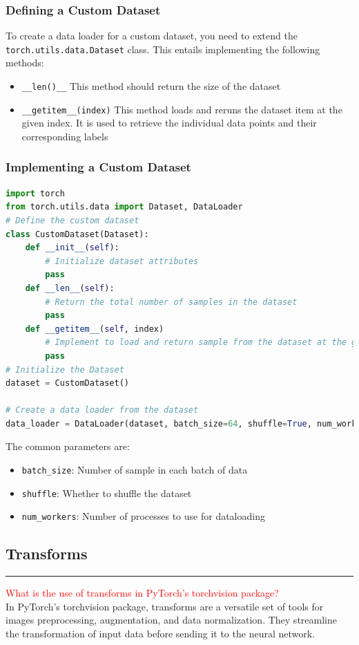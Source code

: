 \documentclass{article}
\newcommand{\code}[1]{\colorbox{light-gray}{\texttt{#1}}}
\begin{document}
\subsubsection{Defining a Custom Dataset}
To create a data loader for a custom dataset, you need to extend the \code{torch.utils.data.Dataset} class. This entails implementing the following methods:
\begin{itemize}
    \item \code{\_\_len()\_\_} This method should return the size of the dataset
    \item \code{\_\_getitem\_\_(index)} This method loads and reruns the dataset item at the given index. It is used to retrieve the individual data points and their corresponding labels
\end{itemize}
\subsubsection{Implementing a Custom Dataset}
\begin{lstlisting}[language=Python]
import torch
from torch.utils.data import Dataset, DataLoader
# Define the custom dataset
class CustomDataset(Dataset):
    def __init__(self):
        # Initialize dataset attributes
        pass
    def __len__(self):
        # Return the total number of samples in the dataset
        pass
    def __getitem__(self, index)
        # Implement to load and return sample from the dataset at the given index
        pass
# Initialize the Dataset
dataset = CustomDataset()

# Create a data loader from the dataset
data_loader = DataLoader(dataset, batch_size=64, shuffle=True, num_workers=2)
\end{lstlisting}
The common parameters are:
\begin{itemize}
    \item \code{batch\_size}: Number of sample in each batch of data
    \item \code{shuffle}: Whether to shuffle the dataset
    \item \code{num\_workers}: Number of processes to use for dataloading
\end{itemize}
\subsection{Transforms}
\noindent
{\color{red} \rule{\linewidth}{0.5mm}}
\textcolor{red}{What is the use of transforms in PyTorch's torchvision package?} \\
\noindent
In PyTorch's torchvision package, transforms are a versatile set of tools for images preprocessing, augmentation, and data normalization. They streamline the transformation of input data before sending it to the neural network. 
\end{document}
